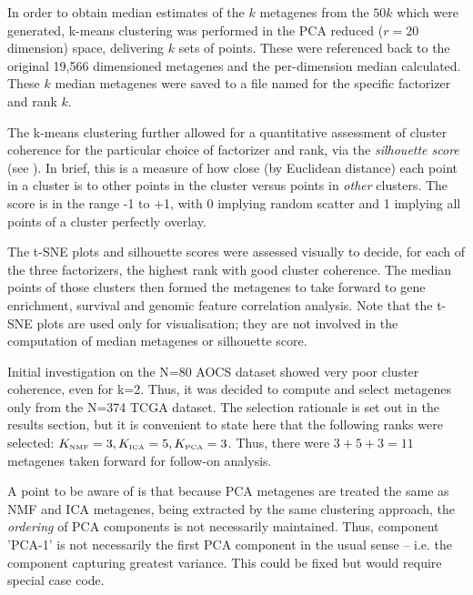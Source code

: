 \documentclass[tikz, 12pt,a4paper,oneside,fleqn]{article}
\begin{document}
In order to obtain median estimates of the $k$ metagenes from the $50 k$ which were generated, k-means clustering was performed in the PCA reduced ($r=20$ dimension) space, delivering $k$ sets of points.  These were referenced back to the original 19,566 dimensioned metagenes and the per-dimension median calculated.  These $k$ median metagenes were saved to a file named for the specific factorizer and rank $k$.  

The k-means clustering further allowed for a quantitative assessment of cluster coherence for the particular choice of factorizer and rank, via the \emph{silhouette score} (see \cite{Wikipedia}).  In brief, this is a measure of how close (by Euclidean distance) each point in a cluster is to other points in the cluster versus points in \emph{other} clusters.  
The score is in the range -1 to +1, with 0 implying random scatter and 1 implying all points of a cluster perfectly overlay.

The t-SNE plots and silhouette scores were assessed visually to decide, for each of the three factorizers, the highest rank with good cluster coherence.  The median points of those clusters then formed the metagenes to take forward to gene enrichment, survival and genomic feature correlation analysis.   
Note that the t-SNE plots are used only for visualisation; they are not involved in the computation of median metagenes or silhouette score.

Initial investigation on the N=80 AOCS dataset showed very poor cluster coherence, even for k=2.   Thus, it was decided to compute and select metagenes only from the N=374 TCGA dataset.   
The selection rationale is set out in the results section, but it is convenient to state here that the following ranks were selected:
$K_{\mbox{\tiny NMF}} = 3, K_{\mbox{\tiny ICA}} = 5, K_{\mbox{\tiny PCA}} =3$.  Thus, there were $3 + 5 + 3 = 11$ metagenes taken forward for follow-on analysis.

A point to be aware of is that because PCA metagenes are treated the same as NMF and ICA metagenes, being extracted by the same clustering approach, the \emph{ordering} of PCA components is not necessarily maintained.   Thus, component 'PCA-1' is not necessarily the first PCA component  in the usual sense -- i.e. the component capturing greatest variance.  This could be fixed but would require special case code.
\end{document}
